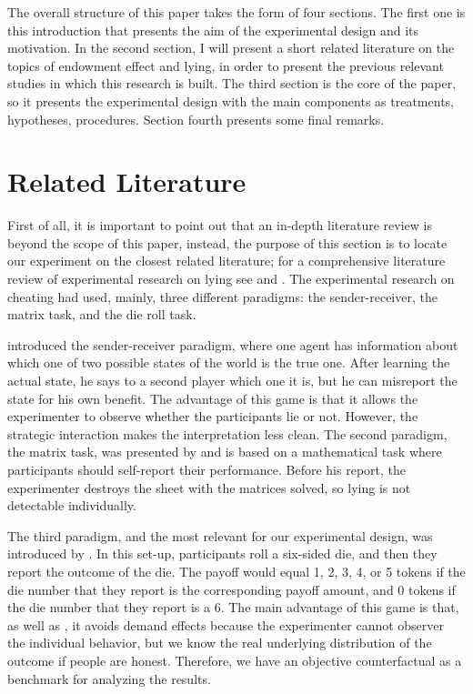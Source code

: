 \documentclass[12pt,final]{article}
\begin{document}
The overall structure of this paper takes the form of four sections. The first one is this introduction that presents the aim of the experimental design and its motivation. In the second section, I will present a short related literature on the topics of endowment effect and lying, in order to present the previous relevant studies in which this research is built. The third section is the core of the paper, so it presents the experimental design with the main components as treatments, hypotheses, procedures. Section fourth presents some final remarks.

\section{Related Literature}\label{sec:literature}
First of all, it is important to point out that an in-depth literature review is beyond the scope of this paper, instead, the purpose of this section is to locate our experiment on the closest related literature; for a comprehensive literature review of experimental research on lying see \citet{Rosenbaum2014} and \citet{Abeler}. The experimental research on cheating had used, mainly, three different paradigms: the sender-receiver, the matrix task, and the die roll task. 

\citet{Gneezy2005} introduced the sender-receiver paradigm, where one agent has information about which one of two possible states of the world is the true one. After learning the actual state, he says to a second player which one it is, but he can misreport the state for his own benefit. The advantage of this game is that it allows the experimenter to observe whether the participants lie or not. However, the strategic interaction makes the interpretation less clean. The second paradigm, the matrix task, was presented by \citet{Mazar2008} and is based on a mathematical task where participants should self-report their performance. Before his report, the experimenter destroys the sheet with the matrices solved, so lying is not detectable individually.

The third paradigm, and the most relevant for our experimental design, was introduced by \citet{Fischbacher2013}. In this set-up, participants roll a six-sided die, and then they report the outcome of the die. The payoff would equal 1, 2, 3, 4, or 5 tokens if the die number that they report is the corresponding payoff amount, and 0 tokens if the die number that they report is a 6.  The main advantage of this game is that, as well as \citet{Mazar2008}, it avoids demand effects because the experimenter cannot observer the individual behavior, but we know the real underlying distribution of the outcome if people are honest. Therefore, we have an objective counterfactual as a benchmark for analyzing the results.
\end{document}
